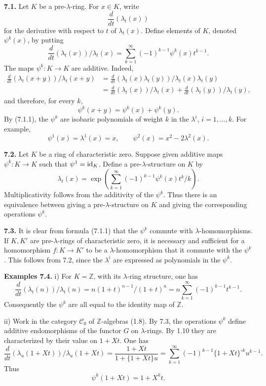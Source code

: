 \documentclass[11pt]{article}
\begin{document}
\textbf{7.1.} Let \(K\) be a pre-\(\lambda\)-ring. For \(x\in K\), write
\[
  \frac{d}{dt}(\lambda_t(x))
\]
for the derivative with respect to \(t\) of \(\lambda_t(x)\). Define elements of \(K\), denoted \(\psi^k(x)\), by putting
\begin{equation}\tag{7.1.1}
  \frac{d}{dt}(\lambda_t(x))/\lambda_t(x)
  =
  \sum_{k=1}^{\infty}(-1)^{k-1}\psi^k(x)t^{k-1}.
\end{equation}
The maps \(\psi^k:K\to K\) are additive. Indeed,
\[
\begin{aligned}
 \frac{d}{dt}(\lambda_t(x+y))/\lambda_t(x+y)
 &=
 \frac{d}{dt}(\lambda_t(x)\lambda_t(y))/\lambda_t(x)\lambda_t(y)\\
 &=
 \frac{d}{dt}(\lambda_t(x))/\lambda_t(x)
 +\frac{d}{dt}(\lambda_t(y))/\lambda_t(y),
\end{aligned}
\]
and therefore, for every \(k\),
\[
  \psi^k(x+y)=\psi^k(x)+\psi^k(y).
\]
By (7.1.1), the \(\psi^k\) are isobaric polynomials of weight \(k\) in the \(\lambda^i\), \(i=1,\ldots,k\). For example,
\[
  \psi^1(x)=\lambda^1(x)=x,
  \qquad
  \psi^2(x)=x^2-2\lambda^2(x).
\]

\textbf{7.2.} Let \(K\) be a ring of characteristic zero. Suppose given additive maps \(\psi^k:K\to K\) such that \(\psi^1=\operatorname{id}_K\). Define a pre-\(\lambda\)-structure on \(K\) by
\begin{equation}\tag{7.2.1}
  \lambda_t(x)=
  \exp\left(\sum_{k=1}^{\infty}(-1)^{k-1}\psi^k(x)t^k/k\right).
\end{equation}
Multiplicativity follows from the additivity of the \(\psi^k\). Thus there is an equivalence between giving a pre-\(\lambda\)-structure on \(K\) and giving the corresponding operations \(\psi^k\).

\textbf{7.3.} It is clear from formula (7.1.1) that the \(\psi^k\) commute with \(\lambda\)-homomorphisms. If \(K,K'\) are pre-\(\lambda\)-rings of characteristic zero, it is necessary and sufficient for a homomorphism \(f:K\to K'\) to be a \(\lambda\)-homomorphism that it commute with the \(\psi^k\). This follows from 7.2, since the \(\lambda^i\) are expressed as polynomials in the \(\psi^k\).

\textbf{Examples 7.4.} i) For \(K=\mathbb Z\), with its \(\lambda\)-ring structure, one has
\[
  \frac{d}{dt}(\lambda_t(n))/\lambda_t(n)
  =
  n(1+t)^{n-1}/(1+t)^n
  =
  n\sum_{k=1}^{\infty}(-1)^{k-1}t^{k-1}.
\]
Consequently the \(\psi^k\) are all equal to the identity map of \(\mathbb Z\).

ii) Work in the category \(\mathscr C_0\) of \(\mathbb Z\)-algebras (1.8). By 7.3, the operations \(\psi^k\) define additive endomorphisms of the functor \(G\) on \(\lambda\)-rings. By 1.10 they are characterized by their value on \(1+Xt\). One has
\[
  \frac{d}{dt}(\lambda_u(1+Xt))/\lambda_u(1+Xt)
  =
  \frac{1+Xt}{1+\{1+Xt\}u}
  =
  \sum_{k=1}^{\infty}(-1)^{k-1}\{1+Xt\}^{\circ k}u^{k-1}.
\]
Thus
\begin{equation}\tag{7.4.1}
  \psi^k(1+Xt)=1+X^k t.
\end{equation}
\end{document}
